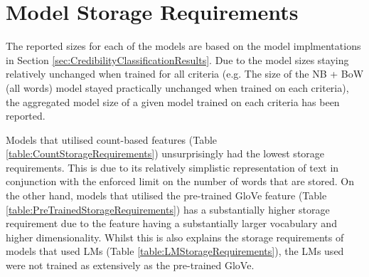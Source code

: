 \documentclass[a4paper,twoside,phd]{BYUPhys}
\begin{document}
\section{Model Storage Requirements}
\label{sec:StorageRequirements}

The reported sizes for each of the models are based on the model implmentations in Section \ref{sec:CredibilityClassificationResults}. Due to the model sizes staying relatively unchanged when trained for all criteria (e.g. The size of the NB + BoW (all words) model stayed practically unchanged when trained on each criteria), the aggregated model size of a given model trained on each criteria has been reported. \newline

Models that utilised count-based features (Table \ref{table:CountStorageRequirements}) unsurprisingly had the lowest storage requirements. This is due to its relatively simplistic representation of text in conjunction with the enforced limit on the number of words that are stored. On the other hand, models that utilised the pre-trained GloVe feature (Table \ref{table:PreTrainedStorageRequirements}) has a substantially higher storage requirement due to the feature having a substantially larger vocabulary and higher dimensionality. Whilst this is also explains the storage requirements of models that used LMs (Table \ref{table:LMStorageRequirements}), the LMs used were not trained as extensively as the pre-trained GloVe.
\end{document}
